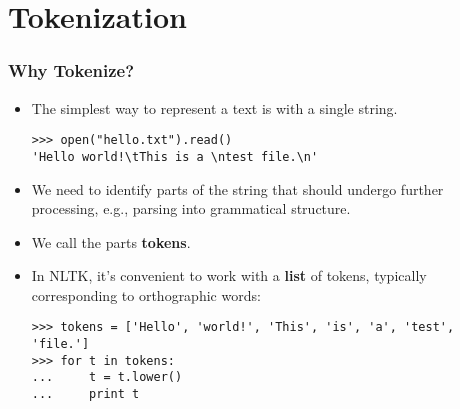 \section{Tokenization}




 
\begin{frame}[fragile]
  \frametitle{Why Tokenize?}

  \begin{itemize}
  \item<1->  The simplest way to represent a text is with a single string.
\begin{verbatim}
>>> open("hello.txt").read()   
'Hello world!\tThis is a \ntest file.\n'  
\end{verbatim}
  \item<2-> We need to identify parts of the string that should
    undergo further processing, e.g., parsing into grammatical structure.
  \item<3-> We call the parts \textbf{tokens}.
  \item<4-> In NLTK, it's convenient to work with a \textbf{list} of
    tokens, typically corresponding to orthographic words: 
{\small
\begin{verbatim}
>>> tokens = ['Hello', 'world!', 'This', 'is', 'a', 'test', 'file.'] 
>>> for t in tokens:
...     t = t.lower()
...     print t   
\end{verbatim}
}
  \end{itemize}
\end{frame}

